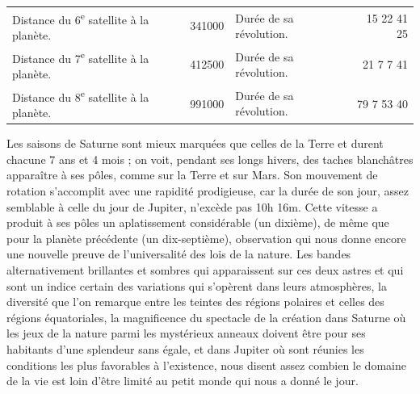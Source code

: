 \documentclass[a4paper, 11pt, oneside, landscape]{article}
\begin{document}
{\begin{table}[H]
\begin{tabular}{l r l r}
        Distance du 6\textsuperscript{e} satellite à la planète. & 341000 & Durée de sa révolution. & 15 22 41 25   \\
        Distance du 7\textsuperscript{e} satellite à la planète. & 412500 & Durée de sa révolution. & 21 7 7 41   \\
        Distance du 8\textsuperscript{e} satellite à la planète. & 991000 & Durée de sa révolution. & 79 7 53 40 \\
    \end{tabular}
\end{table}} Les saisons de Saturne sont mieux marquées que celles de la Terre et durent chacune 7 ans et 4 mois ; on voit, pendant ses longs hivers, des taches blanchâtres apparaître à ses pôles, comme sur la Terre et sur Mars. Son mouvement de rotation s'accomplit avec une rapidité prodigieuse, car la durée de son jour, assez semblable à celle du jour de Jupiter, n'excède pas 10h 16m. Cette vitesse a produit à ses pôles un aplatissement considérable (un dixième), de même que pour la planète précédente (un dix-septième), observation qui nous donne encore une nouvelle preuve de l'universalité des lois de la nature. Les bandes alternativement brillantes et sombres qui apparaissent sur ces deux astres et qui sont un indice certain des variations qui s'opèrent dans leurs atmosphères, la diversité que l'on remarque entre les teintes des régions polaires et celles des régions équatoriales, la magnificence du spectacle de la création dans Saturne où les jeux de la nature parmi les mystérieux anneaux doivent être pour ses habitants d'une splendeur sans égale, et dans Jupiter où sont réunies les conditions les plus favorables à l'existence, nous disent assez combien le domaine de la vie est loin d'être limité au petit monde qui nous a donné le jour.
\end{document}
